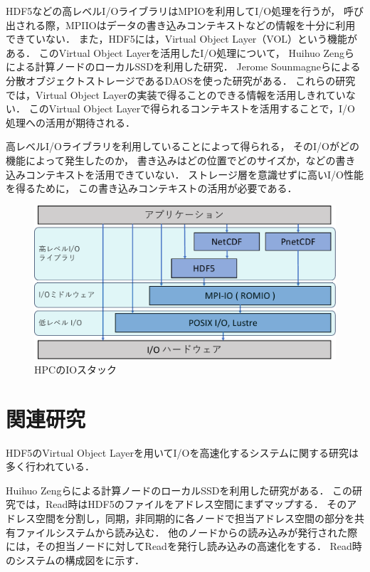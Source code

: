 \documentclass[submit,techrep,noauthor]{ipsj}
\begin{document}
HDF5などの高レベルI/OライブラリはMPIOを利用してI/O処理を行うが，
呼び出される際，MPIIOはデータの書き込みコンテキストなどの情報を十分に利用できていない．
また，HDF5には，Virtual Object Layer（VOL）という機能がある．
このVirtual Object Layerを活用したI/O処理について，
Huihuo Zengらによる計算ノードのローカルSSDを利用した研究\cite{zheng2022hdf5}．
Jerome Sounmagneらによる分散オブジェクトストレージであるDAOSを使った研究がある\cite{soumagne2021accelerating}．
これらの研究では，Virtual Object Layerの実装で得ることのできる情報を活用しきれていない．
このVirtual Object Layerで得られるコンテキストを活用することで，I/O処理への活用が期待される．

高レベルI/Oライブラリを利用していることによって得られる，
そのI/Oがどの機能によって発生したのか，
書き込みはどの位置でどのサイズか，などの書き込みコンテキストを活用できていない．
ストレージ層を意識せずに高いI/O性能を得るために，
この書き込みコンテキストの活用が必要である．


\begin{figure}[t]
	\centering
	\includegraphics[page=1,width=\linewidth]{figure-crop.pdf}
	\caption{HPCのIOスタック}
	\label{fig:iotstack}
\end{figure}


\section{関連研究}

HDF5のVirtual Object Layerを用いてI/Oを高速化するシステムに関する研究は多く行われている．

Huihuo Zengらによる計算ノードのローカルSSDを利用した研究がある\cite{zheng2022hdf5}．
この研究では，Read時はHDF5のファイルをアドレス空間にまずマップする．
そのアドレス空間を分割し，同期，非同期的に各ノードで担当アドレス空間の部分を共有ファイルシステムから読み込む．
他のノードからの読み込みが発行された際には，その担当ノードに対してReadを発行し読み込みの高速化をする．
Read時のシステムの構成図をに示す．
\end{document}
